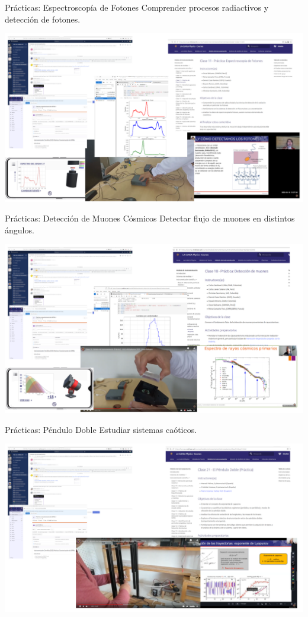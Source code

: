 \begin{frame}{Prácticas: Espectroscopía de Fotones}
Comprender procesos radiactivos y detección de fotones.
\begin{center}
\includegraphics[scale=0.6]{imagenes/gamma-WF.png}
\end{center}
\end{frame}


\begin{frame}{Prácticas: Detección de Muones Cósmicos}
Detectar flujo de muones en distintos ángulos.
\begin{center}
\includegraphics[scale=0.6]{imagenes/muon-WF.png}
\end{center}
\end{frame}

\begin{frame}{Prácticas: Péndulo Doble}
Estudiar sistemas caóticos.
\begin{center}
\includegraphics[scale=0.6]{imagenes/penduloDoble-WF.png}
\end{center}
\end{frame}

